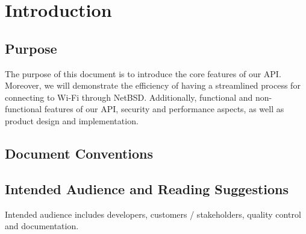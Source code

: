 \section{Introduction}

\subsection{Purpose}
The purpose of this document is to introduce the core features of our API. Moreover, we will demonstrate the efficiency of having a streamlined process for connecting to Wi-Fi through NetBSD. Additionally, functional and non-functional features of our API, security and performance aspects, as well as product design and implementation. 

\subsection{Document Conventions}

\subsection{Intended Audience and Reading Suggestions}
Intended audience includes developers, customers / stakeholders, quality control and documentation. 

